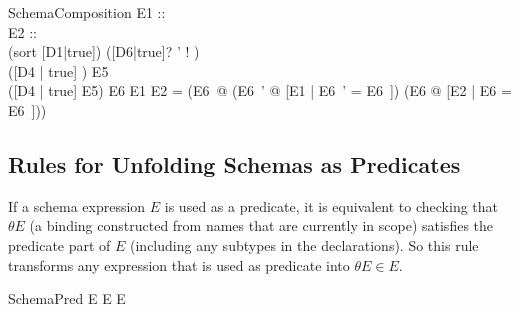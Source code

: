 \documentclass{entcs}
\newcommand{\sexprUnfoldsTo}{\mathrel{=_{se}}}
\newcommand{\schemaEquals}{\mathrel{=_S}}
\newcommand{\is}{\mathrel{is}}
\begin{document}
\begin{zedrule}{SchemaComposition}
  E1 :: \power [D1 | true] \\
  E2 :: \power [D2 | true] \\
  (sort [D1|true]) \is ([D6|true]? \land [D4|true]' \land
                        [D8|true]! \land [D9|true]) \\
  ([D4 | true] \schemaminus [D2 | true]) \is E5\\
  ([D4 | true] \schemaminus E5) \is E6 %
\derives
  E1 \semi E2 =
  (\exists E6~\bowtie @ (\exists E6~' @ [E1 | \theta E6~' = \theta E6~\bowtie])
                   \land
                   (\exists E6   @ [E2 | \theta E6   = \theta E6~\bowtie]))
\end{zedrule}



%


\subsection{Rules for Unfolding Schemas as Predicates}

If a schema expression $E$ is used as a predicate, it is equivalent to
checking that $\theta E$ (a binding constructed from names that are
currently in scope) satisfies the predicate part of $E$ 
(including any subtypes in the declarations).  So this rule
transforms any expression that is used as predicate into $\theta E \in E$.
\begin{zedrule}{SchemaPred}
  E \iff \theta E \in E
\end{zedrule}
\end{document}
